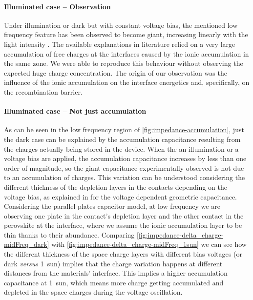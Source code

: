 		\paragraph{Illuminated case -- Observation}
		Under illumination or dark but with constant voltage bias, the mentioned low frequency feature has been observed to become giant, increasing linearly with the light intensity \cite{Juarez-Perez2014,Kim2015c,Zarazua2016,Zarazua2016a,Almora2018}.
		The available explanations in literature relied on a very large accumulation of free charges at the interfaces caused by the ionic accumulation in the same zone.
		We were able to reproduce this behaviour without observing the expected huge charge concentration.
		The origin of our observation was the influence of the ionic accumulation on the interface energetics and, specifically, on the recombination barrier.


		\paragraph{Illuminated case -- Not just accumulation}
		As can be seen in the low frequency region of \cref{fig:impedance-accumulation}, just the dark case can be explained by the accumulation capacitance resulting from the charges actually being stored in the device.
		When the an illumination or a voltage bias are applied, the accumulation capacitance increases by less than one order of magnitude, so the giant capacitance experimentally observed is not due to an accumulation of charges.
		This variation can be understood considering the different thickness of the depletion layers in the contacts depending on the voltage bias, as explained in  for the voltage dependent geometric capacitance.
		Considering the parallel plates capacitor model, at low frequency we are observing one plate in the contact's depletion layer and the other contact in the perovskite at the interface, where we assume the ionic accumulation layer to be thin thanks to their abundance.
		Comparing \cref{fig:impedance-delta_charge-midFreq_dark} with \cref{fig:impedance-delta_charge-midFreq_1sun} we can see how the different thickness of the space charge layers with different bias voltages (or dark \textsl{versus} \SI{1}{sun}) implies that the charge variation happens at different distances from the materials' interface.
		This implies a higher accumulation capacitance at \SI{1}{sun}, which means more charge getting accumulated and depleted in the space charges during the voltage oscillation.


